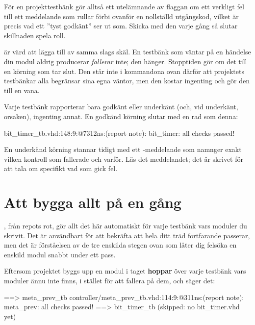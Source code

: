 För en projekttestbänk gör alltså ett utelämnande av flaggan om ett verkligt fel till ett meddelande
som rullar förbi ovanför en nollställd utgångskod, vilket är precis vad ett ”tyst godkänt” ser ut som.
Skicka med den varje gång så slutar skillnaden spela roll.

 är värd att lägga till av samma slags skäl. En testbänk som väntar på en
händelse din modul aldrig producerar \emph{fallerar} inte; den hänger. Stopptiden gör om det till en
körning som tar slut. Den står inte i kommandona ovan därför att projektets testbänkar alla begränsar
sina egna väntor, men den kostar ingenting och  gör den till en vana.

Varje testbänk rapporterar bara godkänt eller underkänt (och, vid underkänt, orsaken), ingenting
annat. En godkänd körning slutar med en rad som denna:

\begin{console}
bit_timer_tb.vhd:148:9:@7312ns:(report note): bit_timer: all checks passed!
\end{console}

En underkänd körning stannar tidigt med ett -meddelande som namnger exakt
vilken kontroll som fallerade och varför. Läs det meddelandet; det är skrivet för att tala om
specifikt vad som gick fel.

\section{Att bygga allt på en gång}
\label{app:sim:make}

, från repots rot, gör allt det här automatiskt för varje testbänk vars
moduler du skrivit. Det är användbart för att bekräfta att hela ditt träd fortfarande passerar, men
det är förståelsen av de tre enskilda stegen ovan som låter dig felsöka en enskild modul snabbt under
ett pass.

Eftersom projektet byggs upp en modul i taget \textbf{hoppar}  över varje
testbänk vars moduler ännu inte finns, i stället för att fallera på dem, och säger det:

\begin{console}
==> meta_prev_tb
controller/meta_prev_tb.vhd:114:9:@311ns:(report note): meta_prev: all checks passed!
==> bit_timer_tb (skipped: no bit_timer.vhd yet)
\end{console}


